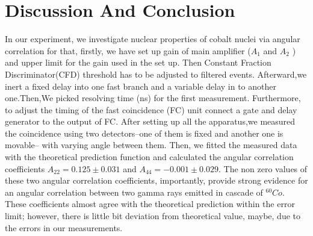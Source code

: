 \section{Discussion And Conclusion}
In our experiment, we investigate nuclear properties of cobalt nuclei via angular correlation for that, firstly, we have set up gain of main amplifier ($ A_{1} $ and $ A_{2} $ ) and upper limit for the gain used in the set up. Then Constant Fraction Discriminator(CFD) threshold has to be adjusted to filtered events. Afterward,we inert a fixed delay into one fast branch and a variable delay in to another one.Then,We picked resolving time (ns) for the first measurement. Furthermore, to adjust the timing of the fast coincidence (FC) unit connect a gate and delay generator to the output of FC.
After setting up all the apparatus,we measured the coincidence using two detectors--one of them is fixed and another one is movable-- with varying angle between them. Then, we fitted the measured data with the theoretical prediction function and calculated the angular correlation coefficients $ A_{22}= 0.125\pm 0.031 $ and $A_{44}=-0.001\pm 0.029  $. The non zero values of these two angular correlation coefficients, importantly, provide strong evidence for an angular correlation between two gamma rays emitted in cascade of $ ^{60}Co $. These coefficients almost agree with the theoretical prediction within the error limit; however, there is little bit deviation from theoretical value, maybe,  due to the errors in our measurements. 